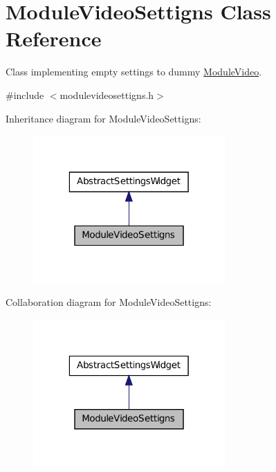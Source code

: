 \hypertarget{class_module_video_settigns}{
\section{ModuleVideoSettigns Class Reference}
\label{d6/d30/class_module_video_settigns}
}


Class implementing empty settings to dummy \hyperlink{class_module_video}{ModuleVideo}.  




{\ttfamily \#include $<$modulevideosettigns.h$>$}



Inheritance diagram for ModuleVideoSettigns:\nopagebreak
\begin{figure}[H]
\begin{center}
\leavevmode
\includegraphics[width=208pt]{d1/ded/class_module_video_settigns__inherit__graph}
\end{center}
\end{figure}


Collaboration diagram for ModuleVideoSettigns:\nopagebreak
\begin{figure}[H]
\begin{center}
\leavevmode
\includegraphics[width=208pt]{d0/d8d/class_module_video_settigns__coll__graph}
\end{center}
\end{figure}
